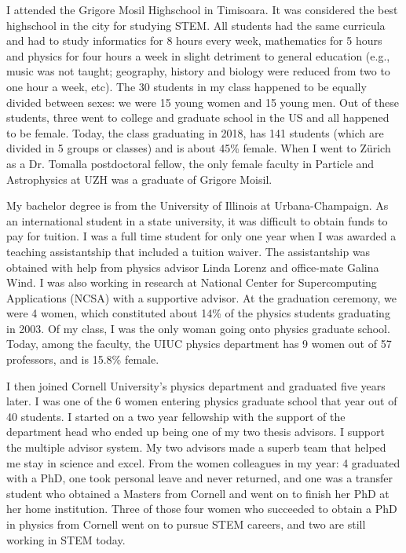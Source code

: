 \documentclass[utf8]{frontiersSCNS} %
\begin{document}
I attended the Grigore Mosil Highschool in Timisoara. It was considered the best highschool in the city for studying STEM. All students had the same curricula and had to study informatics for 8 hours every week, mathematics for 5 hours and physics for four hours a week in slight detriment to general education (e.g., music was not taught; geography, history and biology were reduced from two to one hour a week, etc).  The 30 students in my class happened to be equally divided between sexes: we were 15 young women and 15 young men. Out of these students, three went to college and graduate school in the US and all happened to be female. Today, the class graduating in 2018, has 141 students (which are divided in 5 groups or classes) and is about 45\% female. When I went to Z\"{u}rich as a Dr. Tomalla postdoctoral fellow, the only female faculty in Particle and Astrophysics at UZH was a graduate of Grigore Moisil. 

My bachelor degree is from the University of Illinois at Urbana-Champaign. As an international student in a state university, it was difficult to obtain funds to pay for tuition. I was a full time student for only one year when I was awarded a teaching assistantship that included a tuition waiver. The assistantship was obtained with help from physics advisor Linda Lorenz and office-mate Galina Wind. I was also working in research at National Center for Supercomputing Applications (NCSA) with a supportive advisor. At the graduation ceremony, we were 4 women, which constituted about 14\% of the physics students graduating in 2003. Of my class, I was the only woman going onto physics graduate school. Today, among the faculty, the UIUC physics department has 9 women out of 57 professors, and is 15.8\% female. 

I then joined Cornell University's physics department and graduated five years later. I was one of the 6 women entering physics graduate school that year out of 40 students. I started on a two year fellowship with the support of the department head who ended up being one of my two thesis advisors. I support the multiple advisor system. My two advisors made a superb team that helped me stay in science and excel. From the women colleagues in my year: 4 graduated with a PhD, one took personal leave and never returned, and one was a transfer student who obtained a Masters from Cornell and went on to finish her PhD at her home institution. Three of those four women who succeeded to obtain a PhD in physics from Cornell went on to pursue STEM careers, and two are still working in STEM today. 
\end{document}
